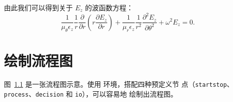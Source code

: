 \documentclass{sjtureport}
\begin{document}
由此我们可以得到关于 $E_z$ 的波函数方程：
\begin{equation}
  \frac{1}{\mu_\theta \epsilon_z} \frac{1}{r} \frac{\partial}{\partial r}
  \left(r \frac{\partial E_z}{\partial r} \right) + \frac{1}{\mu_r \epsilon_z}
  \frac{1}{r^2} \frac{\partial^2E_z}{\partial\theta^2} +\omega^2 E_z = 0.
\end{equation}

\chapter{绘制流程图}

图~\ref{fig:flow_chart} 是一张流程图示意。使用  环境，搭配四种预定义节
点（\verb|startstop|、\verb|process|、\verb|decision| 和 \verb|io|），可以容易地
绘制出流程图。

\begin{figure}[!htp]
  \centering
  
  \label{fig:flow_chart}
\end{figure}

\end{document}
